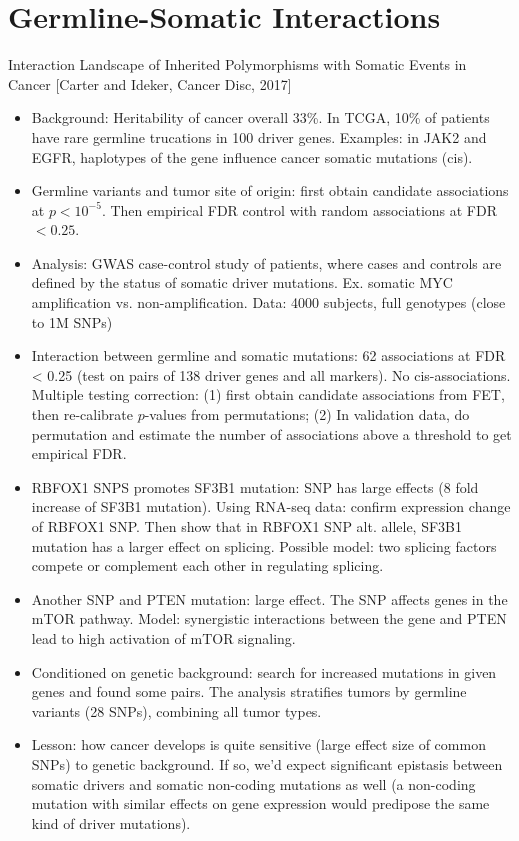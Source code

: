 \documentclass{report}
\begin{document}
\section{Germline-Somatic Interactions}

Interaction Landscape of Inherited Polymorphisms with Somatic Events in Cancer [Carter and Ideker, Cancer Disc, 2017]
\begin{itemize}
	\item Background: Heritability of cancer overall 33\%. In TCGA, 10\% of patients have rare germline trucations in 100 driver genes. Examples: in JAK2 and EGFR, haplotypes of the gene influence cancer somatic mutations (cis). 
	
	\item Germline variants and tumor site of origin: first obtain candidate associations at $p < 10^{-5}$. Then empirical FDR control with random associations at FDR $<0.25$. 
	
	\item Analysis: GWAS case-control study of patients, where cases and controls are defined by the status of somatic driver mutations. Ex. somatic MYC amplification vs. non-amplification. Data: 4000 subjects, full genotypes (close to 1M SNPs) 
	
	\item Interaction between germline and somatic mutations: 62 associations at FDR < 0.25 (test on pairs of 138 driver genes and all markers). No cis-associations. Multiple testing correction: (1) first obtain candidate associations from FET, then re-calibrate $p$-values from permutations; (2) In validation data, do permutation and estimate the number of associations above a threshold to get empirical FDR. 
	
	\item RBFOX1 SNPS promotes SF3B1 mutation: SNP has large effects (8 fold increase of SF3B1 mutation). Using RNA-seq data: confirm expression change of RBFOX1 SNP. Then show that in RBFOX1 SNP alt. allele, SF3B1 mutation has a larger effect on splicing. Possible model: two splicing factors compete or complement each other in regulating splicing. 
	
	\item Another SNP and PTEN mutation: large effect. The SNP affects genes in the mTOR pathway. Model: synergistic interactions between the gene and PTEN lead to high activation of mTOR signaling. 
	
	\item Conditioned on genetic background: search for increased mutations in given genes and found some pairs. The analysis stratifies tumors by germline variants (28 SNPs), combining all tumor types. 
	
	\item Lesson: how cancer develops is quite sensitive (large effect size of common SNPs) to genetic background. If so, we’d expect significant epistasis between somatic drivers and somatic non-coding mutations as well (a non-coding mutation with similar effects on gene expression would predipose the same kind of driver mutations). 
\end{itemize}
\end{document}
